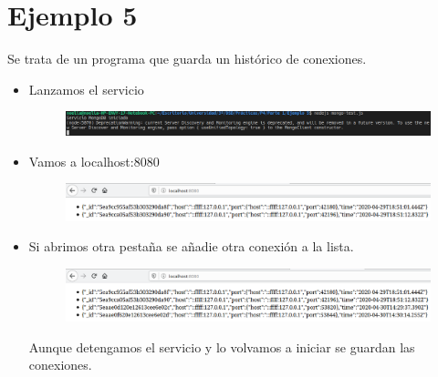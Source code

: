 \documentclass{article}
\begin{document}
	\section{Ejemplo 5}
	Se trata de un programa que guarda un histórico de conexiones.
	\begin{itemize}
		\item Lanzamos el servicio
		\begin{figure}[H]
			\centering
			\includegraphics[totalheight=0.9cm]{img/16.png}
		\end{figure}
		\item Vamos a localhost:8080
		\begin{figure}[H]
			\centering
			\includegraphics[totalheight=1.38cm]{img/17.png}
		\end{figure}
		\item Si abrimos otra pestaña se añadie otra conexión a la lista.
		\begin{figure}[H]
			\centering
			\includegraphics[totalheight=1.92cm]{img/18.png}
		\end{figure}
		Aunque detengamos el servicio y lo volvamos a iniciar se guardan las conexiones.
	\end{itemize}
\end{document}
